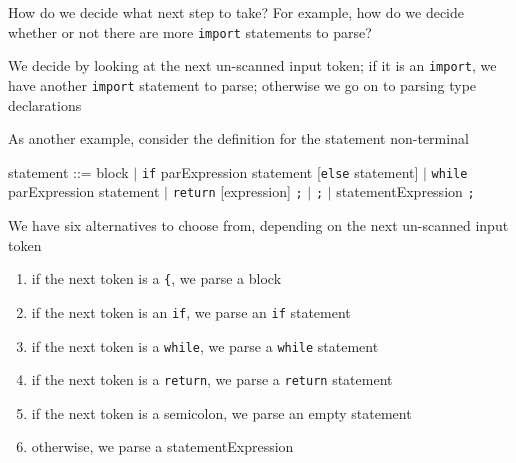 \documentclass[8pt,a4paper,compress,handout]{beamer}
\newcommand{\mm}[1]{$#1$}
\newenvironment{spaced}
{
\smallskip
\hspace{.5cm}
\begin{minipage}[c]{\textwidth}
}
{
\end{minipage}
\smallskip
}
\begin{document}
\begin{frame}[fragile]
\pause

How do we decide what next step to take? For example, how do we decide whether or not there are more \lstinline{import} statements to parse? 

\pause
\bigskip

We decide by looking at the next un-scanned input token; if it is an \lstinline{import}, we have another \lstinline{import} statement to parse; otherwise we go on to parsing type declarations

\pause
\bigskip

As another example, consider the definition for the statement non-terminal

\text{ }
\begin{spaced}
\begin{production}
statement ::= block
                  \mm{|} \lstinline{if} parExpression statement [\lstinline{else} statement]
                  \mm{|} \lstinline{while} parExpression statement
                  \mm{|} \lstinline{return} [expression] \lstinline{;}
                  \mm{|} \lstinline{;}
                  \mm{|} statementExpression \lstinline{;}
\end{production}
\end{spaced}

\pause
\bigskip

We have six alternatives to choose from, depending on the next un-scanned input token

\begin{enumerate}
\item if the next token is a \lstinline${$, we parse a block
\item if the next token is an \lstinline{if}, we parse an \lstinline{if} statement
\item if the next token is a \lstinline{while}, we parse a \lstinline{while} statement
\item if the next token is a \lstinline{return}, we parse a \lstinline{return} statement
\item if the next token is a semicolon, we parse an empty statement
\item otherwise, we parse a statementExpression
\end{enumerate}
\end{frame}
\end{document}
